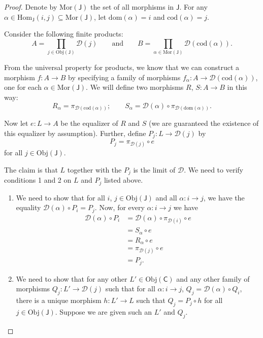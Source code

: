 \documentclass[a4paper,10pt]{scrreprt}
\newcommand{\Obj}{\mathrm{Obj}}
\newcommand{\Hom}{\mathrm{Hom}}
\newcommand{\Mor}{\mathrm{Mor}}
\newcommand{\dom}{\mathrm{dom}}
\newcommand{\cod}{\mathrm{cod}}
\theoremstyle{definition}
\theoremstyle{plain}
\theoremstyle{remark}
\begin{document}
\begin{proof}
  Denote by $\Mor(\mathsf{J})$ the set of all morphisms in $\mathsf{J}$. For any $\alpha \in \Hom_{\mathsf{J}}(i, j) \subseteq \Mor(\mathsf{J})$, let $\dom(\alpha) = i$ and $\cod(\alpha) = j$.

  Consider the following finite products:
  \begin{equation*}
    A = \prod_{j \in \Obj(\mathsf{J})} \mathcal{D}(j)\qquad\text{and}\qquad B = \prod_{\alpha \in \Mor(\mathsf{J})} \mathcal{D}(\cod(\alpha)).
  \end{equation*}

  From the universal property for products, we know that we can construct a morphism $f\colon A \to B$ by specifying a family of morphisms $f_{\alpha}\colon A \to \mathcal{D}(\cod(\alpha))$, one for each $\alpha \in \Mor(\mathsf{J})$. We will define two morphisms $R$, $S\colon A \to B$ in this way:
  \begin{equation*}
    R_{\alpha} = \pi_{\mathcal{D}(\cod(\alpha))};\qquad S_{\alpha} = \mathcal{D}(\alpha) \circ \pi_{\mathcal{D}(\dom(\alpha))}.
  \end{equation*}

  Now let $e\colon L \to A$ be the equalizer of $R$ and $S$ (we are guaranteed the existence of this equalizer by assumption). Further, define $P_{j}\colon L \to \mathcal{D}(j)$ by
  \begin{equation*}
    P_{j} = \pi_{\mathcal{D}(j)} \circ e
  \end{equation*}
  for all $j \in \Obj(\mathsf{J})$.

  The claim is that $L$ together with the $P_{j}$ is the limit of $\mathcal{D}$. We need to verify conditions 1 and 2 on $L$ and $P_{j}$ listed above.
  \begin{enumerate}
    \item We need to show that for all $i$, $j \in \Obj(\mathsf{J})$ and all $\alpha\colon i \to j$, we have the equality $\mathcal{D}(\alpha) \circ P_{i} = P_{j}$. Now, for every $\alpha\colon i \to j$ we have
      \begin{align*}
        \mathcal{D}(\alpha) \circ P_{i} &= \mathcal{D}(\alpha) \circ \pi_{\mathcal{D}(i)} \circ e \\
        &= S_{\alpha} \circ e \\
        &= R_{\alpha} \circ e \\
        &= \pi_{\mathcal{D}(j)} \circ e \\
        &= P_{j}.
      \end{align*}

    \item We need to show that for any other $L' \in \Obj(\mathsf{C})$ and any other family of morphisms $Q_{j}\colon L' \to \mathcal{D}(j)$ such that for all $\alpha\colon i \to j$, $Q_{j} = \mathcal{D}(\alpha) \circ Q_{i}$, there is a unique morphism $h\colon L' \to L$ such that $Q_{j} = P_{j} \circ h$ for all $j \in \Obj(\mathsf{J})$. Suppose we are given such an $L'$ and $Q_{j}$.


\end{enumerate}
\end{proof}
\end{document}
